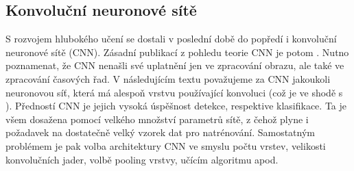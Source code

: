 \subsection{Konvoluční neuronové sítě}
S rozvojem hlubokého učení se dostali v poslední době do popředí i konvoluční neuronové sítě (CNN). Zásadní publikací z pohledu teorie CNN je potom  \cite{cnn1}. Nutno poznamenat, že CNN nenašli své uplatnění jen ve zpracování obrazu, ale také ve zpracování časových řad. V následujícím textu považujeme za CNN jakoukoli neuronovou síť, která má alespoň vrstvu používající konvoluci (což je ve shodě s \cite{deep}). Předností CNN je jejich vysoká úspěšnost detekce, respektive klasifikace. Ta je všem dosažena pomocí velkého množství parametrů sítě, z čehož plyne i požadavek na dostatečně velký vzorek dat pro natrénování. Samostatným problémem je pak volba architektury CNN ve smyslu počtu vrstev, velikosti konvolučních jader,  volbě pooling vrstvy, učícím algoritmu apod.\par
